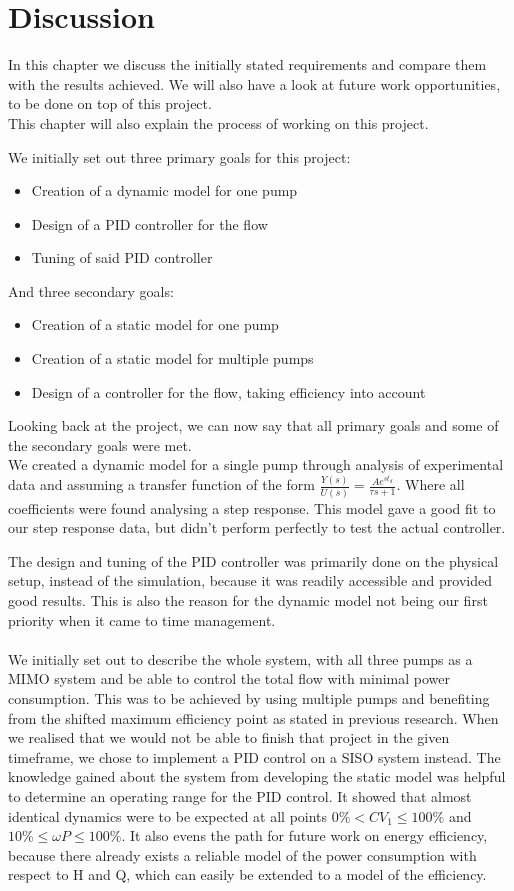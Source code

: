 \chapter{Discussion}\label{ch:discussion}
In this chapter we discuss the initially stated requirements
and compare them with the results achieved.
We will also have a look at future work opportunities,
to be done on top of this project.\\
This chapter will also explain the process of working on this project.

We initially set out three primary goals for this project:

\begin{itemize}
\item Creation of a dynamic model for one pump
\item Design of a PID controller for the flow
\item Tuning of said PID controller 
\end{itemize}
And three secondary goals:

\begin{itemize}
\item Creation of a static model for one pump
\item Creation of a static model for multiple pumps
\item Design of a controller for the flow, taking efficiency into account
\end{itemize}
Looking back at the project,
we can now say that all primary goals
and some of the secondary goals were met.
\\
We created a dynamic model for a single pump
through analysis of experimental data
and assuming a transfer function of the form 
$\frac{Y(s)}{U(s)}=\frac{A e^{s t_d}}{\tau s + 1}$.
Where all coefficients were found analysing a step response.
This model gave a good fit to our step response data,
but didn't perform perfectly to test the actual controller.

The design and tuning of the PID controller was primarily done on the physical setup,
instead of the simulation, because it was readily accessible
and provided good results.
This is also the reason for the dynamic model not being our first priority when it came to time management.
\\\\We initially set out to describe the whole system,
with all three pumps as a MIMO system and be able to control the total flow with minimal power consumption.
This was to be achieved by using multiple pumps and benefiting from the shifted maximum efficiency point as stated in previous research.
When we realised that we would not be able to finish that project in the given timeframe,
we chose to implement a PID control on a SISO system instead.
The knowledge gained about the system from developing the static model was helpful to determine an operating range for the PID control.
It showed that almost identical dynamics were to be expected at all points
$0\%<CV_1\leq100\%$ and $10\%\leq\omega P\leq100\%$.
It also evens the path for future work on energy efficiency,
because there already exists a reliable model of the power consumption with respect to H and Q,
which can easily be extended to a model of the efficiency.

